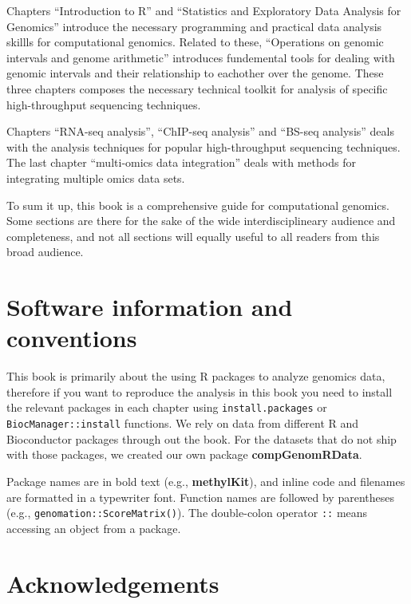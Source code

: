 \documentclass[12pt,]{krantz}
\theoremstyle{definition}
\theoremstyle{definition}
\theoremstyle{definition}
\theoremstyle{remark}
\begin{document}
Chapters ``Introduction to R'' and ``Statistics and Exploratory Data
Analysis for Genomics'' introduce the necessary programming and
practical data analysis skillls for computational genomics. Related to
these, ``Operations on genomic intervals and genome arithmetic''
introduces fundemental tools for dealing with genomic intervals and
their relationship to eachother over the genome. These three chapters
composes the necessary technical toolkit for analysis of specific
high-throughput sequencing techniques.

Chapters ``RNA-seq analysis'', ``ChIP-seq analysis'' and ``BS-seq
analysis'' deals with the analysis techniques for popular
high-throughput sequencing techniques. The last chapter ``multi-omics
data integration'' deals with methods for integrating multiple omics
data sets.

To sum it up, this book is a comprehensive guide for computational
genomics. Some sections are there for the sake of the wide
interdisciplineary audience and completeness, and not all sections will
equally useful to all readers from this broad audience.

\hypertarget{software-information-and-conventions}{%
\section*{Software information and
conventions}\label{software-information-and-conventions}}


This book is primarily about the using R packages to analyze genomics
data, therefore if you want to reproduce the analysis in this book you
need to install the relevant packages in each chapter using
\texttt{install.packages} or \texttt{BiocManager::install} functions. We
rely on data from different R and Bioconductor packages through out the
book. For the datasets that do not ship with those packages, we created
our own package \textbf{compGenomRData}.

Package names are in bold text (e.g., \textbf{methylKit}), and inline
code and filenames are formatted in a typewriter font. Function names
are followed by parentheses (e.g., \texttt{genomation::ScoreMatrix()}).
The double-colon operator \texttt{::} means accessing an object from a
package.

\hypertarget{acknowledgements}{%
\section*{Acknowledgements}\label{acknowledgements}}
\end{document}
